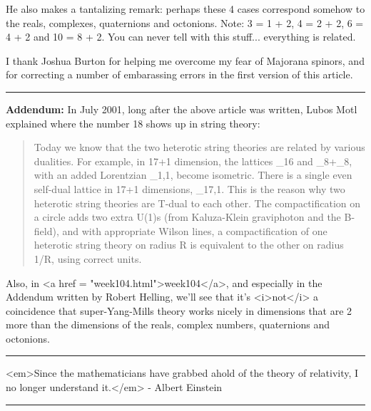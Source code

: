 He also makes a tantalizing remark: perhaps these 4 cases correspond
somehow to the reals, complexes, quaternions and octonions.  Note:
3 = 1 + 2, 4 = 2 + 2, 6 = 4 + 2 and 10 = 8 + 2.  You can never tell
with this stuff... everything is related.

I thank Joshua Burton for helping me overcome my fear of Majorana
spinors, and for correcting a number of embarassing errors in the
first version of this article.

\par\noindent\rule{\textwidth}{0.4pt}
\textbf{Addendum:} In July 2001, long after the above article was written,
Lubos Motl explained where the number 18 shows up in string theory:


\begin{quote}
Today we know that the two heterotic string theories are related by
various dualities. For example, in 17+1 dimension, the lattices 
\Gamma _{16} and \Gamma _{8}+\Gamma _{8}, 
with an added Lorentzian \Gamma _{1,1}, become
isometric. There is a single even self-dual lattice in 17+1 dimensions,
\Gamma _{17,1}. This is the reason why two heterotic string theories 
are T-dual to each other. The compactification on a circle adds two extra
U(1)s (from Kaluza-Klein graviphoton and the B-field), and with
appropriate Wilson lines, a compactification of one heterotic string
theory on radius R is equivalent to the other on radius 1/R, using 
correct units.
\end{quote}


Also, in <a href = "week104.html">week104</a>, and especially in the 
Addendum written by Robert Helling, we'll see that it's <i>not</i>
a coincidence that super-Yang-Mills theory works nicely in dimensions 
that are 2 more than the dimensions of the reals, complex numbers,
quaternions and octonions.  

\par\noindent\rule{\textwidth}{0.4pt}
<em>Since the mathematicians have grabbed ahold of the theory of relativity,
I no longer understand it.</em> - Albert Einstein


\par\noindent\rule{\textwidth}{0.4pt}

